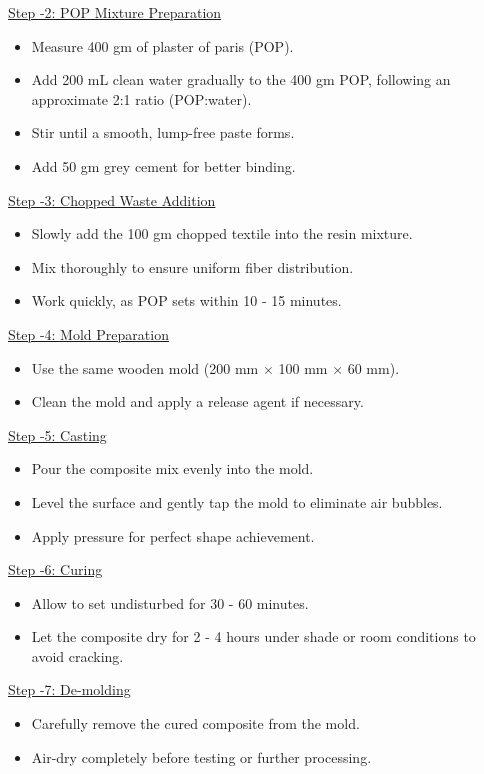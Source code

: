 \noindent\underline{Step -2: POP Mixture Preparation}
\begin{itemize}[leftmargin=1.5cm]
	\item Measure 400 gm of plaster of paris (POP).
	\item Add 200 mL clean water gradually to the 400 gm POP, following an approximate 2:1 ratio (POP:water).
	\item Stir until a smooth, lump-free paste forms.
	\item Add 50 gm grey cement for better binding.
\end{itemize}

\noindent\underline{Step -3: Chopped Waste Addition }
\begin{itemize}[leftmargin=1.5cm]
	\item Slowly add the 100 gm chopped textile into the resin mixture.
	\item Mix thoroughly to ensure uniform fiber distribution.
	\item Work quickly, as POP sets within 10 - 15 minutes.
\end{itemize}

\noindent\underline{Step -4: Mold Preparation }
\begin{itemize}
	\item Use the same wooden mold (200 mm $\times$ 100 mm $\times$ 60 mm).
	\item Clean the mold and apply a release agent if necessary.
\end{itemize}

\noindent\underline{Step -5: Casting }
\begin{itemize}[leftmargin=1.5cm]
	\item Pour the composite mix evenly into the mold.
	\item Level the surface and gently tap the mold to eliminate air bubbles.
	\item Apply pressure for perfect shape achievement.
\end{itemize}

\noindent\underline{Step -6: Curing }
\begin{itemize}[leftmargin=1.5cm]
	\item Allow to set undisturbed for 30 - 60 minutes.
	\item Let the composite dry for 2 - 4 hours under shade or room conditions to avoid cracking.
\end{itemize}

\noindent\underline{Step -7: De-molding }
\begin{itemize}[leftmargin=1.5cm]
	\item Carefully remove the cured composite from the mold.
	\item Air-dry completely before testing or further processing.
\end{itemize}

